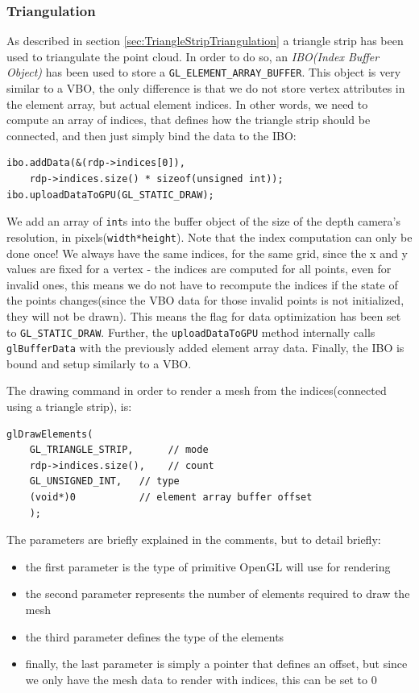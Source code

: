 \documentclass[]{article}
\begin{document}
\subsubsection{Triangulation}

As described in section \ref{sec:TriangleStripTriangulation} a triangle strip has been used to triangulate the point cloud. In order to do so, an \textit{IBO(Index Buffer Object)} has been used to store a \verb|GL_ELEMENT_ARRAY_BUFFER|. This object is very similar to a VBO, the only difference is that we do not store vertex attributes in the element array, but actual element indices. In other words, we need to compute an array of indices, that defines how the triangle strip should be connected, and then just simply bind the data to the IBO:
\begin{verbatim}
ibo.addData(&(rdp->indices[0]), 
    rdp->indices.size() * sizeof(unsigned int));
ibo.uploadDataToGPU(GL_STATIC_DRAW);
\end{verbatim}

We add an array of \verb|int|s into the buffer object of the size of the depth camera's resolution, in pixels(\verb|width*height|). Note that the index computation can only be done once! We always have the same indices, for the same grid, since the x and y values are fixed for a vertex - the indices are computed for all points, even for invalid ones, this means we do not have to recompute the indices if the state of the points changes(since the VBO data for those invalid points is not initialized, they will not be drawn). This means the flag for data optimization has been set to \verb|GL_STATIC_DRAW|. Further, the \verb|uploadDataToGPU| method internally calls  \verb|glBufferData| with the previously added element array data. Finally, the IBO is bound and setup similarly to a VBO.

The drawing command in order to render a mesh from the indices(connected using a triangle strip), is:
\begin{verbatim}
glDrawElements(
	GL_TRIANGLE_STRIP,      // mode
	rdp->indices.size(),    // count
	GL_UNSIGNED_INT,   // type
	(void*)0           // element array buffer offset
	);
\end{verbatim}

The parameters are briefly explained in the comments, but to detail briefly:
\begin{itemize}
\item the first parameter is the type of primitive OpenGL will use for rendering
\item the second parameter represents the number of elements required to draw the mesh
\item the third parameter defines the type of the elements 
\item finally, the last parameter is simply a pointer that defines an offset, but since we only have the mesh data to render with indices, this can be set to 0
\end{itemize}
 
\end{document}
